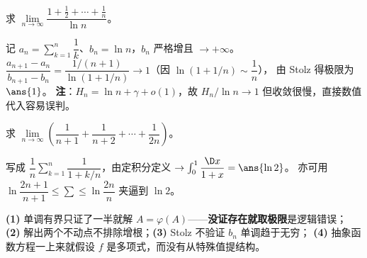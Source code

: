 \documentclass[11pt,a4paper]{ctexart}
\begin{document}
\begin{exa}[Stolz]
求 $\lim\limits_{n\to\infty}\dfrac{1+\frac12+\cdots+\frac1n}{\ln n}$。
\end{exa}
\begin{solution}
记 $a_n=\sum\limits_{k=1}^n\dfrac1k$、$b_n=\ln n$，$b_n$ 严格增且 $\to+\infty$。
$\dfrac{a_{n+1}-a_n}{b_{n+1}-b_n}=\dfrac{1/(n+1)}{\ln(1+1/n)}\to1$（因 $\ln(1+1/n)\sim\dfrac1n$），
由 Stolz 得极限为 $\ans{1}$。
\textbf{注}：$H_n=\ln n+\gamma+o(1)$，故 $H_n/\ln n\to1$ 但收敛很慢，直接数值代入容易误判。
\end{solution}

\begin{exa}[夹逼 / 调和和]
求 $\lim\limits_{n\to\infty}\left(\dfrac1{n+1}+\dfrac1{n+2}+\cdots+\dfrac1{2n}\right)$。
\end{exa}
\begin{solution}
写成 $\dfrac1n\sum\limits_{k=1}^n\dfrac{1}{1+k/n}$，由定积分定义
$\to\int_0^1\dfrac{\D x}{1+x}=\ans{\ln 2}$。
亦可用 $\ln\dfrac{2n+1}{n+1}\le\sum\le\ln\dfrac{2n}{n}$ 夹逼到 $\ln2$。
\end{solution}

\begin{warnbox}[新压轴的常见失误]
\textbf{(1)} 单调有界只证了一半就解 $A=\varphi(A)$——\textbf{没证存在就取极限}是逻辑错误；
\textbf{(2)} 解出两个不动点不排除增根；\textbf{(3)} Stolz 不验证 $b_n$ 单调趋于无穷；
\textbf{(4)} 抽象函数方程一上来就假设 $f$ 是多项式，而没有从特殊值提结构。
\end{warnbox}
\end{document}
